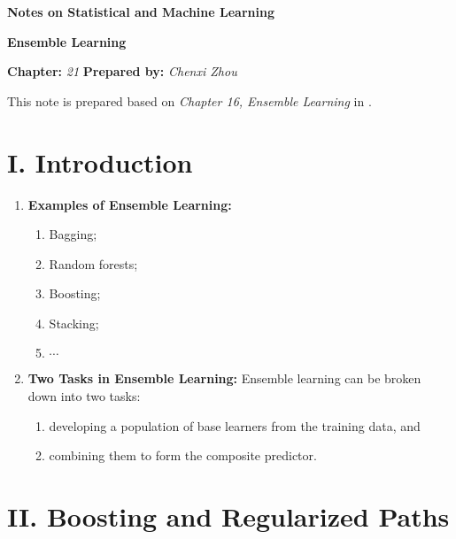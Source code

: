 \documentclass[12pt]{article}
\newcommand{\titlebox}[4]{
\begin{tcolorbox}[colback = blue!5!white!95, colframe = blue!70!black
]
  \noindent \textbf{ #1 } \hfill \textit{#2} 
  \begin{center}
  	 \LARGE{\textbf{#3}}
  \end{center}
\textbf{Chapter:} \textit{#4} \hfill \textbf{Prepared by:} \textit{Chenxi Zhou}
\end{tcolorbox}
}
\begin{document}
\titlebox{Notes on Statistical and Machine Learning}{}{Ensemble Learning}{21}
\thispagestyle{plain}

\vspace{10pt}

This note is prepared based on \textit{Chapter 16, Ensemble Learning} in \textcite{Friedman2001-np}. 

\section*{I. Introduction}

\begin{enumerate}[label=\textbf{\arabic*.}]

	\item \textbf{Examples of Ensemble Learning:} 
	\begin{enumerate}
		\item Bagging; 
		\item Random forests; 
		\item Boosting; 
		\item Stacking; 
		\item $\cdots$
	\end{enumerate}
	
	\item \textbf{Two Tasks in Ensemble Learning:} Ensemble learning can be broken down into two tasks: 
	\begin{enumerate}
		\item developing a population of base learners from the training data, and 
		\item combining them to form the composite predictor. 
	\end{enumerate}

\end{enumerate}


\section*{II. Boosting and Regularized Paths}
\end{document}
